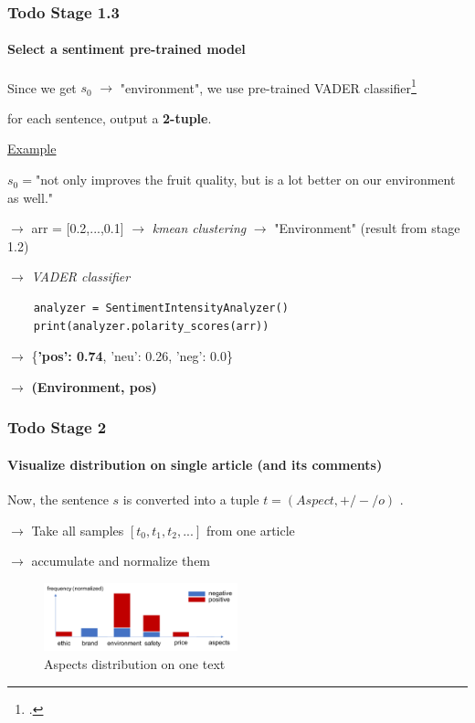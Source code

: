 \documentclass{tum-presentation}
\begin{document}
\begin{frame}[fragile]
  \frametitle{Todo Stage 1.3}
  \framesubtitle{Select a sentiment pre-trained model }
  \begin{description}
    \item Since we get $s_0$ $\to$ "environment", we use pre-trained VADER classifier\footcite{hutto2014vader}
    \item for each sentence, output a \textbf{2-tuple}.
    \pause 
    \vspace{0.3cm}
    \item \underline{Example}
    \item $s_0=$"not only improves the fruit quality, but is a lot better on our environment as well."
    \pause 
    \vspace{0.2cm}
    \item $\to$ arr = [0.2,...,0.1] $\to$ \textit{kmean clustering}  $\to$  "Environment" (result from stage 1.2)
    \pause 
    \item $\to$ \textit{VADER classifier}
    \begin{lstlisting}
    analyzer = SentimentIntensityAnalyzer()
    print(analyzer.polarity_scores(arr))
  \end{lstlisting}
  \item $\to$ \{\textbf{'pos': 0.74}, 'neu': 0.26, 'neg': 0.0\}
  \pause 
  \item $\to$ \textbf{(Environment, pos)}
  \end{description}
\end{frame}

\begin{frame}
  \frametitle{Todo Stage 2}
  
 \framesubtitle{Visualize distribution on single article (and its comments) }
 \begin{description}
  \item Now, the sentence $s$ is converted into a tuple $t=(Aspect, +/-/o)$ . 
  \pause 
  \item $\to$ Take all samples $[t_0, t_1, t_2, ...]$ from one article
  \item $\to$ accumulate and normalize them
  \pause 
\end{description}
\begin{figure}[t]
  
 \includegraphics[width = 0.5\textwidth]{figures/distribution.pdf}
 \caption{Aspects distribution on one text}
 \end{figure}
\end{frame}
\end{document}
